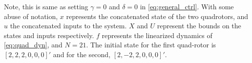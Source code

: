 Note, this is same as setting $\gamma=0$ and $\delta=0$ in \eqref{eq:general_ctrl}. With some abuse of notation, $x$ represents the concatenated state of the two quadrotors, and $u$ the concatenated inputs to the system. $X$ and $U$ represent the bounds on the states and inputs respectively. $f$ represents the linearized dynamics of \eqref{eq:quad_dyn}, and $N=21$. The initial state for the first quad-rotor is $[2,2,2,0,0,0]'$ and for the second, $[2, -2 , 2 ,0 ,0 ,0]'$.


